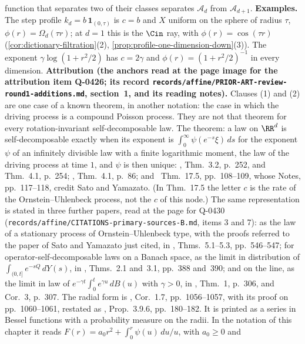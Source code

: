 \begin{proposition}
{function that separates two of their classes separates $\mathcal{A}_d$ from
$\mathcal{A}_{d+1}$. \textbf{Examples.} The step profile $k_d = b\,\mathbf 1_{(0,\tau)}$ is
$c = b$ and $X$ uniform on the sphere of radius $\tau$, $\phi(r) = \Omega_d(\tau r)$; at $d = 1$
this is the $\Cin$ ray, with $\phi(r) = \cos(\tau r)$
(\ref{cor:dictionary-filtration}(2), \ref{prop:profile-one-dimension-down}(3)). The \Matern{} exponent $\gamma\log(1 + r^2/2)$ has
$c = 2\gamma$ and $\phi(r) = (1 + r^2/2)^{-1}$ in every dimension. \textbf{Attribution (the
anchors read at the page image for the attribution item Q-0426; its record
\texttt{records/affine/PRIOR-ART-review-round1-additions.md}, section~1, and its reading
notes).} Clauses (1) and (2) are one case of a known theorem, in another notation: the case in
which the driving \Levy{} process is a compound Poisson process. They are not that theorem for
every rotation-invariant self-decomposable law. The theorem: a law on $\RR^d$ is
self-decomposable exactly when its exponent is $\int_0^\infty\psi(e^{-s}\xi)\,ds$ for the exponent
$\psi$ of an infinitely divisible law with a finite logarithmic moment, the law of the driving
\Levy{} process at time $1$, and $\psi$ is then unique: , Thm.~3.2,
p.~252, and Thm.~4.1, p.~254; , Thm.~4.1, p.~86; and
~Thm.~17.5, pp.~108--109, whose Notes, pp.~117--118, credit Sato and
Yamazato. (In Thm.~17.5 the letter $c$ is the rate of the Ornstein--Uhlenbeck process, not the
$c$ of this node.) The same representation is stated in three further papers, read at the page
for Q-0430 (\texttt{records/affine/CITATIONS-primary-sources-B.md}, items 3 and 7): as the law
of a stationary process of Ornstein--Uhlenbeck type, with the proofs referred to the paper of
Sato and Yamazato just cited, in , Thms.~5.1--5.3, pp.~546--547; for
operator-self-decomposable laws on a Banach space, as the limit in distribution of
$\int_{(0,t]}e^{-sQ}\,dY(s)$, in , Thms.~2.1 and~3.1, pp.~388
and~390; and on the line, as the limit in law of $e^{-\gamma t}\int_0^t e^{\gamma u}\,dB(u)$
with $\gamma > 0$, in , Thm.~1, p.~306, and Cor.~3, p.~307. The radial form is , Cor.~1.7, pp.~1056--1057, with
its proof on pp.~1060--1061, restated as , Prop.~3.9.6, pp.~180--182.
It is printed as a series in Bessel functions with a probability measure on the radii. In the
notation of this chapter it reads $F(r) = a_0 r^2 + \int_0^r\psi(u)\,du/u$, with $a_0 \ge 0$ and
}
\end{proposition}
